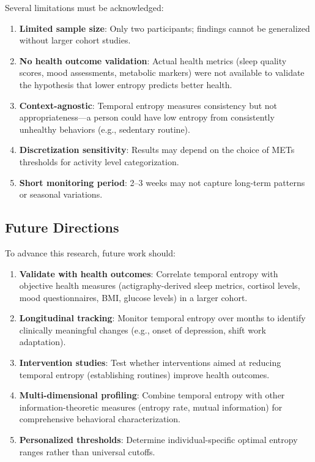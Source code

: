 \documentclass[12pt,letterpaper]{article}
\begin{document}
Several limitations must be acknowledged:

\begin{enumerate}
    \item \textbf{Limited sample size}: Only two participants; findings cannot be generalized without larger cohort studies.
    \item \textbf{No health outcome validation}: Actual health metrics (sleep quality scores, mood assessments, metabolic markers) were not available to validate the hypothesis that lower entropy predicts better health.
    \item \textbf{Context-agnostic}: Temporal entropy measures consistency but not appropriateness—a person could have low entropy from consistently unhealthy behaviors (e.g., sedentary routine).
    \item \textbf{Discretization sensitivity}: Results may depend on the choice of METs thresholds for activity level categorization.
    \item \textbf{Short monitoring period}: 2--3 weeks may not capture long-term patterns or seasonal variations.
\end{enumerate}

\subsection{Future Directions}

To advance this research, future work should:

\begin{enumerate}
    \item \textbf{Validate with health outcomes}: Correlate temporal entropy with objective health measures (actigraphy-derived sleep metrics, cortisol levels, mood questionnaires, BMI, glucose levels) in a larger cohort.
    \item \textbf{Longitudinal tracking}: Monitor temporal entropy over months to identify clinically meaningful changes (e.g., onset of depression, shift work adaptation).
    \item \textbf{Intervention studies}: Test whether interventions aimed at reducing temporal entropy (establishing routines) improve health outcomes.
    \item \textbf{Multi-dimensional profiling}: Combine temporal entropy with other information-theoretic measures (entropy rate, mutual information) for comprehensive behavioral characterization.
    \item \textbf{Personalized thresholds}: Determine individual-specific optimal entropy ranges rather than universal cutoffs.
\end{enumerate}
\end{document}
